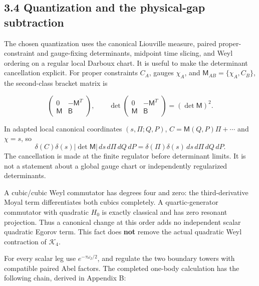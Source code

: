 \hypertarget{quantization-and-the-physical-gap-subtraction}{%
\subsection{3.4 Quantization and the physical-gap subtraction}\label{quantization-and-the-physical-gap-subtraction}}

The chosen quantization uses the canonical Liouville measure, paired proper-constraint and gauge-fixing determinants, midpoint time slicing, and Weyl ordering on a regular local Darboux chart. It is useful to make the determinant cancellation explicit. For proper constraints \(C_A\), gauges \(\chi_A\), and \(\mathsf M_{AB}=\{\chi_A,C_B\}\), the second-class bracket matrix is

\[
\begin{pmatrix}0&-\mathsf M^T\\ \mathsf M&\mathsf B\end{pmatrix},
\qquad
\det\begin{pmatrix}0&-\mathsf M^T\\ \mathsf M&\mathsf B\end{pmatrix}
=(\det\mathsf M)^2 .
\tag{3.14}
\]

In adapted local canonical coordinates \((s,\Pi;Q,P)\), \(C=\mathsf M(Q,P)\Pi+\cdots\) and \(\chi=s\), so \[
\delta(C)\delta(s)|\det\mathsf M|\,ds\,d\Pi\,dQ\,dP
=\delta(\Pi)\delta(s)\,ds\,d\Pi\,dQ\,dP .
\] The cancellation is made at the finite regulator before determinant limits. It is not a statement about a global gauge chart or independently regularized determinants.

A cubic/cubic Weyl commutator has degrees four and zero: the third-derivative Moyal term differentiates both cubics completely. A quartic-generator commutator with quadratic \(H_0\) is exactly classical and has zero resonant projection. Thus a canonical change at this order adds no independent scalar quadratic Egorov term. This fact does \textbf{not} remove the actual quadratic Weyl contraction of \(\mathcal K_4\).

For every scalar leg use \(e^{-\tau\omega_I/2}\), and regulate the two boundary towers with compatible paired Abel factors. The completed one-body calculation has the following chain, derived in Appendix B:

